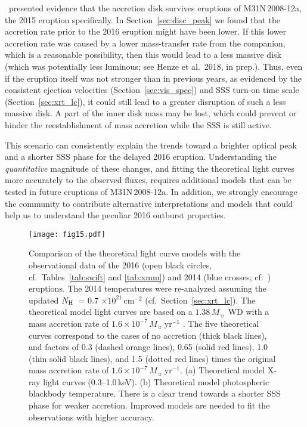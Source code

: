 \documentclass[twocolumn,tighten]{aastex6}
\def\novak{{M31N\,2008-12a}}
\newcommand{\nh}{\hbox{$N_{\rm H}$}~}
\newcommand{\hcm}[1]{$\times 10^{#1}$\,cm$^{-2}$}
\newcommand{\xtwok}{\citetalias{2015A&A...580A..46H}}
\newcommand{\hstphot}{\citetalias{2017ApJ...849...96D}}
\begin{document}
\hstphot\ presented evidence that the accretion disk survives eruptions of \novak, the 2015 eruption specifically. In Section~\ref{sec:disc_peak} we found that the accretion rate prior to the 2016 eruption might have been lower. If this lower accretion rate was caused by a lower mass-transfer rate from the companion, which is a reasonable possibility, then this would lead to a less massive disk (which was potentially less luminous; see Henze et al.\ 2018, in prep.). Thus, even if the eruption itself was not stronger than in previous years, as evidenced by the consistent ejection velocities (Section~\ref{sec:vis_spec}) and SSS turn-on time scale (Section~\ref{sec:xrt_lc}), it could still lead to a greater disruption of such a less massive disk. A part of the inner disk mass may be lost, which could prevent or hinder the reestablishment of mass accretion while the SSS is still active.

This scenario can consistently explain the trends toward a brighter optical peak and a shorter SSS phase for the delayed 2016 eruption. Understanding the \textit{quantitative} magnitude of these changes, and fitting the theoretical light curves more accurately to the observed fluxes, requires additional models that can be tested in future eruptions of \novak. In addition, we strongly encourage the community to contribute alternative interpretations and models that could help us to understand the peculiar 2016 outburst properties.

\begin{figure}
\texttt{[image: fig15.pdf]}
\caption{Comparison of the theoretical light curve models with the observational data of the 2016 (open black circles, cf.\ Tables~\ref{tab:swift} and \ref{tab:xmm}) and 2014 (blue crosses; cf.\ \xtwok) eruptions. The 2014 temperatures were re-analyzed assuming the updated \nh = $0.7$ \hcm{21} (cf.\ Section~\ref{sec:xrt_lc}). The theoretical model light curves are based on a $1.38\,M_\sun$ WD with a mass accretion rate of $1.6\times 10^{-7}\,M_\sun$\,yr$^{-1}$ \citep{2017ApJ...838..153K}. The five theoretical curves correspond to the cases of no accretion (thick black lines), and factors of 0.3 (dashed orange lines), 0.65 (solid red lines), 1.0 (thin solid black lines), and 1.5 (dotted red lines) times the original mass accretion rate of $1.6\times 10^{-7}\,M_\sun$\,yr$^{-1}$. (a) Theoretical model X-ray light curves (0.3--1.0\,keV). (b) Theoretical model photospheric blackbody temperature. There is a clear trend towards a shorter SSS phase for weaker accretion. Improved models are needed to fit the observations with higher accuracy.}
\label{fig:sss_model}
\end{figure}
\end{document}
